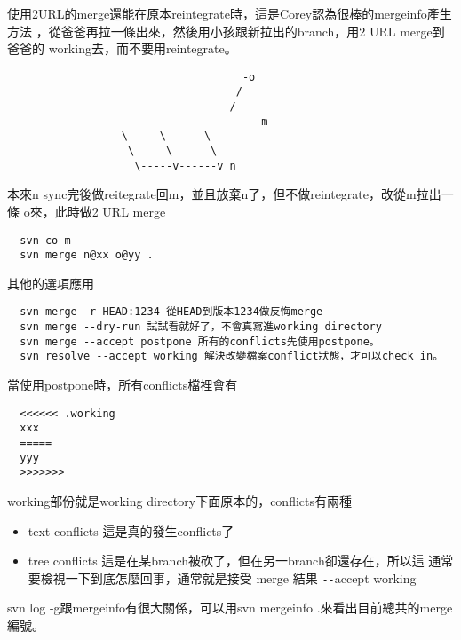   使用2URL的merge還能在原本reintegrate時，這是Corey認為很棒的mergeinfo產生方法
  ，從爸爸再拉一條出來，然後用小孩跟新拉出的branch，用2 URL merge到爸爸的
  working去，而不要用reintegrate。
  \begin{verbatim}
                                     -o
                                    /
                                   /
   -----------------------------------  m
                  \     \      \
                   \     \      \       
                    \-----v------v n
  \end{verbatim}
  本來n sync完後做reitegrate回m，並且放棄n了，但不做reintegrate，改從m拉出一條
  o來，此時做2 URL merge
  \begin{verbatim}
  svn co m
  svn merge n@xx o@yy .
  \end{verbatim}
  其他的選項應用
  \begin{verbatim}
  svn merge -r HEAD:1234 從HEAD到版本1234做反悔merge
  svn merge --dry-run 試試看就好了，不會真寫進working directory
  svn merge --accept postpone 所有的conflicts先使用postpone。
  svn resolve --accept working 解決改變檔案conflict狀態，才可以check in。
  \end{verbatim}
  當使用postpone時，所有conflicts檔裡會有
  \begin{verbatim}
  <<<<<< .working
  xxx
  =====
  yyy
  >>>>>>>
  \end{verbatim}
  working部份就是working directory下面原本的，conflicts有兩種
  \begin{itemize}
    \item text conflicts 這是真的發生conflicts了
    \item tree conflicts 這是在某branch被砍了，但在另一branch卻還存在，所以這
      通常要檢視一下到底怎麼回事，通常就是接受 merge 結果 \verb=--=accept working
  \end{itemize}
  svn log -g跟mergeinfo有很大關係，可以用svn mergeinfo
  .來看出目前總共的merge編號。

